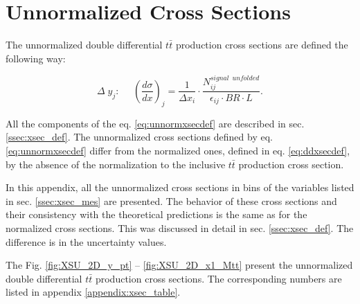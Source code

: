 \chapter{Unnormalized Cross Sections}\label{appendix:unnorm_XSec}

The unnormalized double differential $t\bar{t}$ production cross sections are defined the following way:

\begin{equation}\label{eq:unnormxsecdef}
 \Delta\;y_{j}: \:\:\:\:\:\:(\frac{d\sigma}{dx})_{j} = \frac{1}{\Delta x_{i}} \cdot \frac{N^{signal\:\;unfolded}_{ij}}{\epsilon_{ij} \cdot BR \cdot L}.
\end{equation}

All the components of the eq. \ref{eq:unnormxsecdef} are described in sec. \ref{ssec:xsec_def}. The unnormalized cross sections
defined by eq. \ref{eq:unnormxsecdef} differ from the normalized ones, defined in eq. \ref{eq:ddxsecdef}, by the absence of
the normalization to the inclusive $t\bar{t}$ production cross section.

In this appendix, all the unnormalized cross sections in bins of the variables listed in sec. \ref{ssec:xsec_mes} are presented.
The behavior of these cross sections and their consistency with the theoretical predictions is the same as for the normalized cross sections.
This was discussed in detail in sec. \ref{ssec:xsec_def}. The difference is in the uncertainty values.

The Fig. \ref{fig:XSU_2D_y_pt} -- \ref{fig:XSU_2D_x1_Mtt} present the unnormalized double differential $t\bar{t}$ production cross sections.
The corresponding numbers are listed in appendix \ref{appendix:xsec_table}.

